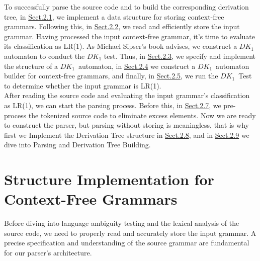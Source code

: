 To successfully parse the source code and to build the corresponding derivation tree, in \hyperref[sec:Structure Implementation for Context-Free Grammars]{Sect.2.1}, we implement a data structure for storing context-free grammars. Following this, in \hyperref[sec:Lexical Analysis and Tokenization]{Sect.2.2}, we read and efficiently store the input grammar. Having processed the input context-free grammar, it's time to evaluate its classification as LR(1). As Michael Sipser's book \cite{sipser} advises, we construct a \({DK_{1}}\) automaton to conduct the  \({DK_{1}}\) test. Thus, in \hyperref[sec:Structure Implementation of DK1 Automaton]{Sect.2.3}, we specify and implement the structure of a \({DK_{1}}\)\ automaton, in \hyperref[sec:DK1 Automaton Builder for a CFG]{Sect.2.4} we construct a \({DK_{1}}\)\ automaton builder for context-free grammars, and finally, in \hyperref[sec:DK1 Test]{Sect.2.5}, we run the \({DK_{1}}\)\ Test to determine whether the input grammar is LR(1).\\


After reading the source code and evaluating the input grammar's classification as LR(1), we can start the parsing process. Before this, in \hyperref[sec:Pre-processing for C0 Source Code]{Sect.2.7}, we pre-process the tokenized source code to eliminate excess elements. Now we are ready to construct the parser, but parsing without storing is meaningless, that is why first we Implement the Derivation Tree structure in \hyperref[sec:Derivation Tree Strucutre and Implementation]{Sect.2.8}, and in \hyperref[sec:Parsing and Derivation Tree Building]{Sect.2.9} we dive into Parsing and Derivation Tree Building.


\newpage


\section{Structure Implementation for Context-Free Grammars}\label{sec:Structure Implementation for Context-Free Grammars}

Before diving into language ambiguity testing and the lexical analysis of the source code, we need to properly read and accurately store the input grammar. A precise specification and understanding of the source grammar are fundamental for our parser’s architecture.\\


